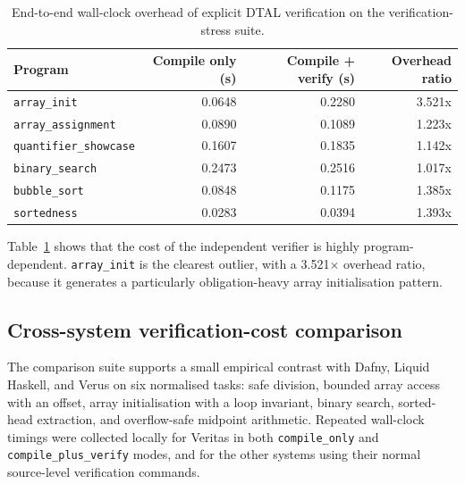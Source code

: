 \begin{table}[h]
  \centering
  \small
  \begin{tabular}{l r r r}
    \hline
    \textbf{Program}              & \textbf{Compile only (s)} & \textbf{Compile + verify (s)} & \textbf{Overhead ratio} \\
    \hline
    \texttt{array\_init}          & 0.0648                    & 0.2280                        & 3.521x                  \\
    \texttt{array\_assignment}    & 0.0890                    & 0.1089                        & 1.223x                  \\
    \texttt{quantifier\_showcase} & 0.1607                    & 0.1835                        & 1.142x                  \\
    \texttt{binary\_search}       & 0.2473                    & 0.2516                        & 1.017x                  \\
    \texttt{bubble\_sort}         & 0.0848                    & 0.1175                        & 1.385x                  \\
    \texttt{sortedness}           & 0.0283                    & 0.0394                        & 1.393x                  \\
    \hline
  \end{tabular}
  \caption{End-to-end wall-clock overhead of explicit DTAL verification on the
    verification-stress suite.}
  \label{tab:verification-stress-overheads}
\end{table}

Table~\ref{tab:verification-stress-overheads} shows that the cost of the independent verifier is highly program-dependent. \texttt{array\_init} is the clearest outlier, with a 3.521$\times$ overhead ratio, because it generates a particularly obligation-heavy array initialisation pattern.

\subsection{Cross-system verification-cost comparison}

The comparison suite supports a small empirical contrast with Dafny, Liquid Haskell, and Verus on six normalised tasks: safe division, bounded array access with an offset, array initialisation with a loop invariant, binary search, sorted-head extraction, and overflow-safe midpoint arithmetic. Repeated wall-clock timings were collected locally for Veritas in both \texttt{compile\_only} and \texttt{compile\_plus\_verify} modes, and for the other systems using their normal source-level verification commands.

